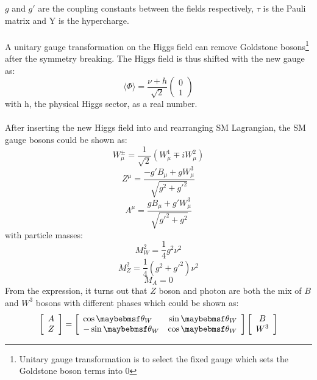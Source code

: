 $g$ and $g'$ are the coupling constants between the fields respectively, $\tau$ is the Pauli matrix and Y is the hypercharge.
\\
\\A unitary gauge transformation on the Higgs field can remove Goldstone bosons\footnote{Unitary gauge transformation is to select the fixed gauge which sets the Goldstone boson terms into 0} after the symmetry breaking. The Higgs field is thus shifted with the new gauge as:
\begin{equation}
\langle\Phi\rangle=\frac{\nu+h}{\sqrt{2}}\left(  \begin{array}{ c } 0 \\ 1\end{array} \right)
\end{equation}
with h, the physical Higgs sector, as a real number.
\\
\\After inserting the new Higgs field into and rearranging SM Lagrangian, the SM gauge bosons could be shown as:  
\begin{equation}
W^{\pm}_\mu=\frac{1}{\sqrt{2}}(W^{1}_\mu\mp iW^{2}_\mu) 
\end{equation}
\begin{equation}
Z^\mu=\frac{-g'B_\mu+gW^3_\mu}{\sqrt{g^2+g'^2}} 
\end{equation}
\begin{equation}
A^\mu=\frac{gB_\mu+g'W^3_\mu}{\sqrt{g'^2+g^2}} 
\end{equation}
with particle masses:
\begin{equation}
M^2_W=\frac{1}{4}g^2\nu^2 
\end{equation}
\begin{equation}
M^2_Z =\frac{1}{4}(g^2+g'^2)\nu^2 
\end{equation}
\begin{equation}
M_A=0 
\end{equation}
From the expression, it turns out that $Z$ boson and photon are both the mix of $B$ and $W^3$ bosons with different phases which could be shown as:
\begin{equation}
 \left[ \begin{array}{c}  A \\ Z \end{array} \right]=\left[ \begin{array}{l r} \cos\theta_W &  \sin\theta_W \\ -\sin\theta_W & \cos\theta_W \end{array} \right]\left[ \begin{array}{c}  B\\ W^3 \end{array} \right] 
  \label{Eq:AZ phase}  
\end{equation}
